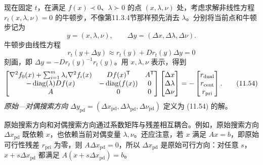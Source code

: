 现在固定 $t$，在满足 $f(x)\prec0$、$\lambda\succ0$ 的点 $(x,\lambda,\nu)$ 处，考虑求解非线性方程 $r_t(x,\lambda,\nu)=0$ 的牛顿步，不像第11.3.4节那样预先消去 $\lambda$。分别将当前点和牛顿步记为
\[
y=(x,\lambda,\nu),\qquad\Delta y=(\Delta x,\Delta\lambda,\Delta\nu).
\]
牛顿步由线性方程
\[
r_t(y+\Delta y)\approx r_t(y)+Dr_t(y)\Delta y=0
\]
刻画，即 $\Delta y=-Dr_t(y)^{-1}r_t(y)$。用 $x,\lambda,\nu$ 表示，得到
\begin{equation}
\begin{bmatrix}
\nabla^2 f_0(x)+\sum_{i=1}^m\lambda_i\nabla^2 f_i(x)&Df(x)^\mathsf T&A^\mathsf T\\
-\operatorname{diag}(\lambda)Df(x)&-\operatorname{diag}(f(x))&0\\
A&0&0
\end{bmatrix}
\begin{bmatrix}\Delta x\\\Delta\lambda\\\Delta\nu\end{bmatrix}
=-\begin{bmatrix}r_{\mathrm{dual}}\\r_{\mathrm{cent}}\\r_{\mathrm{pri}}\end{bmatrix}.
\tag{11.54}
\end{equation}
\emph{原始—对偶搜索方向} $\Delta y_{\mathrm{pd}}=(\Delta x_{\mathrm{pd}},\Delta\lambda_{\mathrm{pd}},\Delta\nu_{\mathrm{pd}})$ 定义为 (11.54) 的解。

原始搜索方向和对偶搜索方向通过系数矩阵与残差相互耦合。例如，原始搜索方向 $\Delta x_{\mathrm{pd}}$ 既依赖 $x$，也依赖当前对偶变量 $\lambda,\nu$。还应注意，若 $x$ 满足 $Ax=b$，即原始可行性残差 $r_{\mathrm{pri}}$ 为零，则 $A\Delta x_{\mathrm{pd}}=0$，所以 $\Delta x_{\mathrm{pd}}$ 是原始可行方向：对任意 $s$，$x+s\Delta x_{\mathrm{pd}}$ 都满足 $A(x+s\Delta x_{\mathrm{pd}})=b$。

